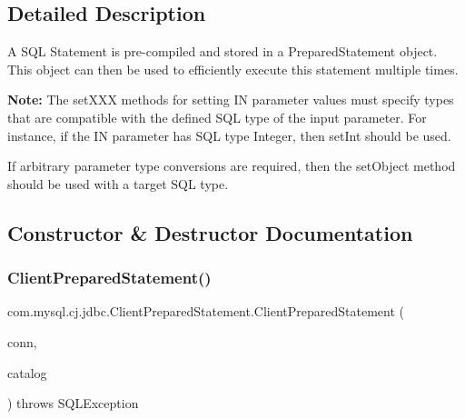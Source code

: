\subsection{Detailed Description}
A S\+QL Statement is pre-\/compiled and stored in a Prepared\+Statement object. This object can then be used to efficiently execute this statement multiple times.

{\bfseries Note\+:} The set\+X\+XX methods for setting IN parameter values must specify types that are compatible with the defined S\+QL type of the input parameter. For instance, if the IN parameter has S\+QL type Integer, then set\+Int should be used. 

If arbitrary parameter type conversions are required, then the set\+Object method should be used with a target S\+QL type. 

\subsection{Constructor \& Destructor Documentation}
\mbox{\label{classcom_1_1mysql_1_1cj_1_1jdbc_1_1_client_prepared_statement_a7a030c8a939d2cd9798b9b6b1ccc52a1}} 
\subsubsection{\texorpdfstring{Client\+Prepared\+Statement()}{ClientPreparedStatement()}\hspace{0.1cm}{\footnotesize\ttfamily [1/3]}}
{\footnotesize\ttfamily com.\+mysql.\+cj.\+jdbc.\+Client\+Prepared\+Statement.\+Client\+Prepared\+Statement (\begin{DoxyParamCaption}\item[{\mbox{\hyperlink{interfacecom_1_1mysql_1_1cj_1_1jdbc_1_1_jdbc_connection}{Jdbc\+Connection}}}]{conn,  }\item[{String}]{catalog }\end{DoxyParamCaption}) throws S\+Q\+L\+Exception\hspace{0.3cm}{\ttfamily [protected]}}

